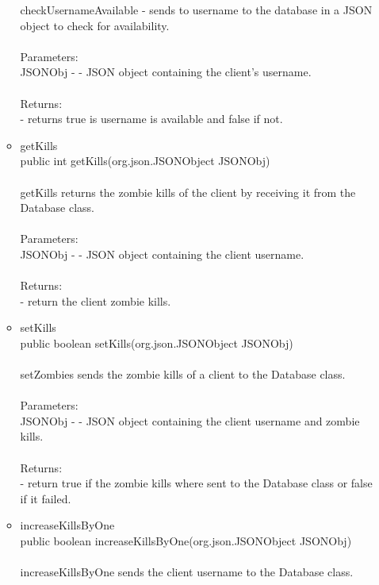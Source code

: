 \documentclass[letterpaper]{article}
\begin{document}
\begin{itemize}
\begin{itemize}
													checkUsernameAvailable - sends to username to the database in a JSON object to check for availability. \\ \\
													Parameters: \\
													JSONObj - - JSON object containing the client's username. \\ \\
													Returns: \\
													- returns true is username is available and false if not.
											\item	getKills \\
													public int getKills(org.json.JSONObject JSONObj) \\ \\
													getKills returns the zombie kills of the client by receiving it from the Database class. \\ \\
													Parameters: \\
													JSONObj - - JSON object containing the client username. \\ \\
													Returns: \\
													- return the client zombie kills.
											\item	setKills \\
													public boolean setKills(org.json.JSONObject JSONObj) \\ \\
													setZombies sends the zombie kills of a client to the Database class. \\ \\
													Parameters: \\
													JSONObj - - JSON object containing the client username and zombie kills. \\ \\
													Returns: \\
													- return true if the zombie kills where sent to the Database class or false if it failed.
											\item	increaseKillsByOne \\
													public boolean increaseKillsByOne(org.json.JSONObject JSONObj) \\ \\
													increaseKillsByOne sends the client username to the Database class. \\ \\

\end{itemize}
\end{itemize}
\end{document}
